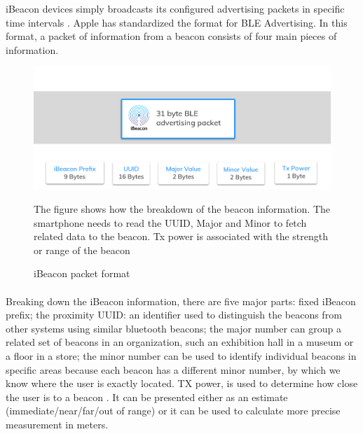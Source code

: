 \documentclass[12pt]{article}
\begin{document}
iBeacon devices simply broadcasts its configured advertising packets in specific time intervals \cite{one}. Apple has standardized the format for BLE Advertising. In this format, a packet of information from a beacon consists of four main pieces of information. \\


\begin{figure}[H]
	\centering
	\includegraphics[width=1.0\linewidth]{media/ibeacon-format.jpg}
	\caption{iBeacon packet format}{The figure shows how the breakdown of the beacon information. The smartphone needs to read the UUID, Major and Minor to fetch related data to the beacon. Tx power is associated with the strength or range of the beacon}
	\label{fig:translate_uml}
\end{figure} 

\paragraph{}Breaking down the iBeacon information, there are five major parts: fixed iBeacon prefix; the proximity UUID: an identifier used to distinguish the beacons from other systems using similar bluetooth beacons; the major number can group a related set of beacons in an organization, such an exhibition hall in a museum or a floor in a store; the minor number can be used to identify individual beacons in specific areas because each beacon has a different minor number, by which we know where the user is exactly located. TX power, is used to determine how close the user is to a beacon \cite{beacons}. It can be presented either as an estimate (immediate/near/far/out of range) or it can be used to calculate more precise measurement in meters.
%
\end{document}
